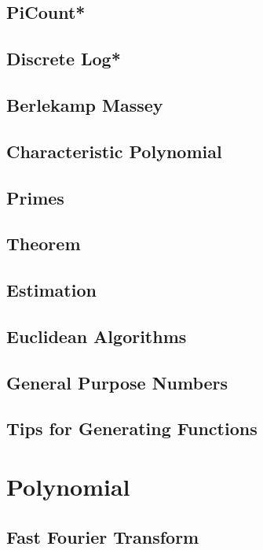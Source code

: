 \subsection{PiCount*} %

\subsection{Discrete Log*} %

\subsection{Berlekamp Massey}

\subsection{Characteristic Polynomial}

\subsection{Primes}

\subsection{Theorem}

\subsection{Estimation}

\subsection{Euclidean Algorithms}

\subsection{General Purpose Numbers}

\subsection{Tips for Generating Functions}



\section{Polynomial}
\subsection{Fast Fourier Transform}


